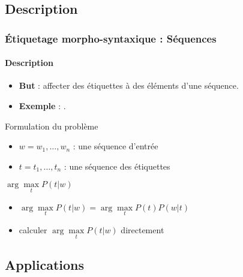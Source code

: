 \documentclass[xcolor=table]{beamer}
\begin{document}
\subsection{Description}

\begin{frame}
\frametitle{Étiquetage morpho-syntaxique : Séquences}
\framesubtitle{Description}


\begin{itemize}
	\item \textbf{But} : affecter des étiquettes à des éléments d'une séquence. 
	\item \textbf{Exemple} : .
\end{itemize}

\begin{block}{Formulation du problème}
	\begin{itemize}
		\item $w = w_1, \ldots, w_n$ : une séquence d'entrée
		\item $t = t_1, \ldots, t_n$ : une séquence des étiquettes
	\end{itemize}
	\begin{center}
		$ \arg\max\limits_t P(t | w)$
	\end{center}
	
	\begin{itemize}
		\item {} $ \arg\max\limits_t P(t | w) = \arg\max\limits_t P(t) P(w | t) $
		\item {} calculer $\arg\max\limits_t P(t | w)$ directement
	\end{itemize}
\end{block}

\end{frame}

\subsection{Applications}
\end{document}
